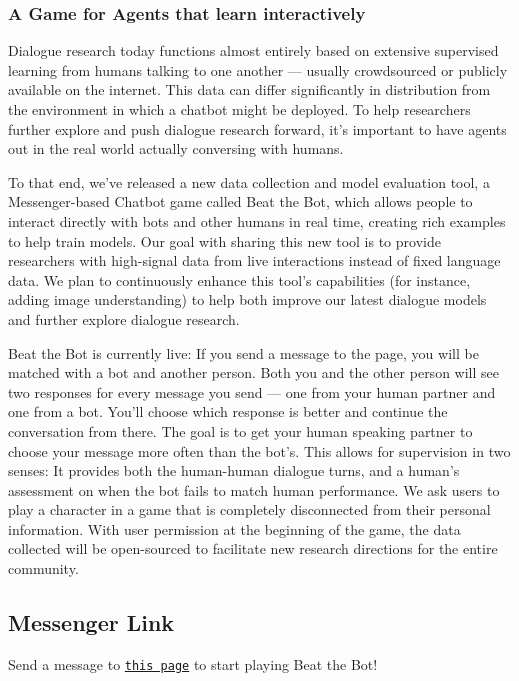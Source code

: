 \subsubsection*{A Game for Agents that learn interactively}

Dialogue research today functions almost entirely based on extensive supervised learning from humans talking to one another — usually crowdsourced or publicly available on the internet. This data can differ significantly in distribution from the environment in which a chatbot might be deployed. To help researchers further explore and push dialogue research forward, it’s important to have agents out in the real world actually conversing with humans.

To that end, we’ve released a new data collection and model evaluation tool, a Messenger-\/based Chatbot game called Beat the Bot, which allows people to interact directly with bots and other humans in real time, creating rich examples to help train models. Our goal with sharing this new tool is to provide researchers with high-\/signal data from live interactions instead of fixed language data. We plan to continuously enhance this tool’s capabilities (for instance, adding image understanding) to help both improve our latest dialogue models and further explore dialogue research.



Beat the Bot is currently live\+: If you send a message to the page, you will be matched with a bot and another person. Both you and the other person will see two responses for every message you send — one from your human partner and one from a bot. You’ll choose which response is better and continue the conversation from there. The goal is to get your human speaking partner to choose your message more often than the bot’s. This allows for supervision in two senses\+: It provides both the human-\/human dialogue turns, and a human’s assessment on when the bot fails to match human performance. We ask users to play a character in a game that is completely disconnected from their personal information. With user permission at the beginning of the game, the data collected will be open-\/sourced to facilitate new research directions for the entire community.

\subsection*{Messenger Link}

Send a message to \href{https://www.facebook.com/Beat-The-Bot-212188996195556/}{\tt this page} to start playing Beat the Bot! 